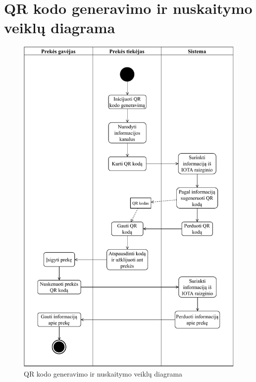 \section{QR kodo generavimo ir nuskaitymo veiklų diagrama}
\begin{figure}[H]
    \centering
    \includegraphics[scale=0.9]{images/ad-4}
    \caption{QR kodo generavimo ir nuskaitymo veiklų diagrama}
\end{figure}

